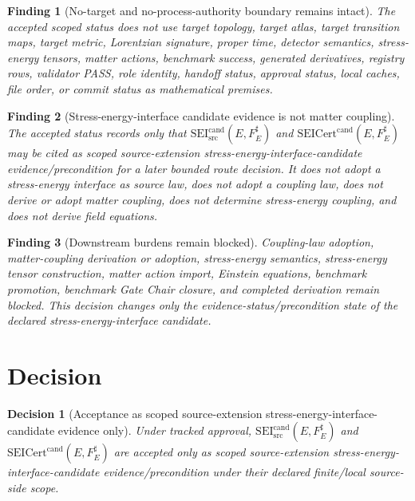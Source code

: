 \documentclass[11pt]{article}
\newcommand{\SEICand}{\mathrm{SEI}_{\mathrm{src}}^{\mathrm{cand}}}
\newcommand{\SEICertCand}{\mathrm{SEICert}^{\mathrm{cand}}}
\newtheorem{decision}{Decision}
\newtheorem{finding}{Finding}
\begin{document}
\begin{finding}[No-target and no-process-authority boundary remains intact]
The accepted scoped status does not use target topology, target atlas, target
transition maps, target metric, Lorentzian signature, proper time, detector
semantics, stress-energy tensors, matter actions, benchmark success,
generated derivatives, registry rows, validator PASS, role identity, handoff
status, approval status, local caches, file order, or commit status as
mathematical premises.
\end{finding}

\begin{finding}[Stress-energy-interface candidate evidence is not matter coupling]
The accepted status records only that \(\SEICand(E,F_E^\sharp)\) and
\(\SEICertCand(E,F_E^\sharp)\) may be cited as scoped source-extension
stress-energy-interface-candidate evidence/precondition for a later bounded
route decision. It does not adopt a stress-energy interface as source law,
does not adopt a coupling law, does not derive or adopt matter coupling, does
not determine stress-energy coupling, and does not derive field equations.
\end{finding}

\begin{finding}[Downstream burdens remain blocked]
Coupling-law adoption, matter-coupling derivation or adoption,
stress-energy semantics, stress-energy tensor construction, matter action
import, Einstein equations, benchmark promotion, benchmark Gate Chair closure,
and completed derivation remain blocked. This decision changes only the
evidence-status/precondition state of the declared stress-energy-interface
candidate.
\end{finding}

\section{Decision}

\begin{decision}[Acceptance as scoped source-extension stress-energy-interface-candidate evidence only]
Under tracked approval, \(\SEICand(E,F_E^\sharp)\) and
\(\SEICertCand(E,F_E^\sharp)\) are accepted only as scoped source-extension
stress-energy-interface-candidate evidence/precondition under their declared
finite/local source-side scope.
\end{decision}
\end{document}
